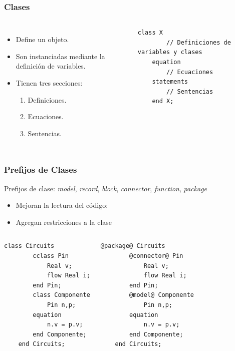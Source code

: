 \documentclass[aspectratio=169,10pt]{beamer}
\begin{document}
\begin{frame}[fragile]
\frametitle{Clases} 
\begin{columns}  
\begin{itemize}
    \item Define un objeto.
    \item Son instanciadas mediante la definición de variables.
    \item Tienen tres secciones:
        \begin{enumerate}
            \item Definiciones.
            \item Ecuaciones.
            \item Sentencias.
        \end{enumerate}
\end{itemize}

\begin{lstlisting}[style=base]
    class X
        // Definiciones de variables y clases   
    equation
        // Ecuaciones
    statements
        // Sentencias
    end X;   
\end{lstlisting}
\end{columns}
\end{frame}

\begin{frame}[fragile]
\frametitle{Prefijos de Clases} 
Prefijos de clase: \textit{model}, \textit{record}, \textit{block}, \textit{connector}, \textit{function}, \textit{package}
\begin{itemize}
    \item Mejoran la lectura del código:
    \item Agregan restricciones a la clase
\end{itemize}   

\begin{columns}  
\begin{lstlisting}[style=base]
    class Circuits
        cclass Pin
            Real v;
            flow Real i;
        end Pin;
        class Componente
            Pin n,p;
        equation 
            n.v = p.v;
        end Componente; 
    end Circuits;   
\end{lstlisting}
\par

\begin{lstlisting}[style=base]
    @package@ Circuits
        @connector@ Pin
            Real v;
            flow Real i;
        end Pin;
        @model@ Componente
            Pin n,p;
        equation 
            n.v = p.v;
        end Componente; 
    end Circuits;   
\end{lstlisting}
\par
\end{columns}
\end{frame}
\end{document}
